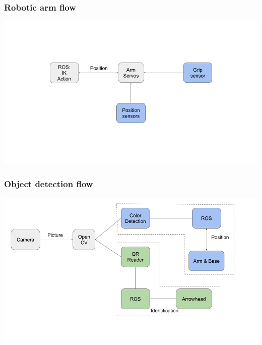 \documentclass{beamer}
\begin{document}
\begin{frame}
    \frametitle{Robotic arm flow}
    \includegraphics[width=\textwidth]{img/arm_flow.png}
\end{frame}

\begin{frame}
    \frametitle{Object detection flow}
    \includegraphics[width=\textwidth]{img/vision_flow.png}
\end{frame}
\end{document}
